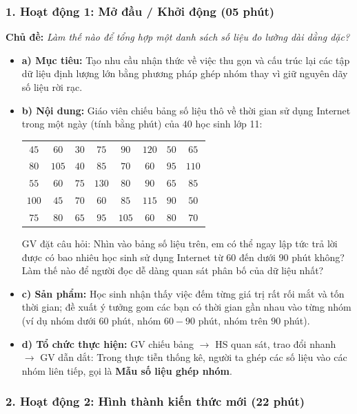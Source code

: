 \documentclass[12pt, a4paper]{article}
\begin{document}
\subsubsection*{1. Hoạt động 1: Mở đầu / Khởi động (05 phút)}
\textbf{Chủ đề:} \textit{Làm thế nào để tổng hợp một danh sách số liệu đo lường dài dằng dặc?}
\begin{itemize}
    \item \textbf{a) Mục tiêu:} Tạo nhu cầu nhận thức về việc thu gọn và cấu trúc lại các tập dữ liệu định lượng lớn bằng phương pháp ghép nhóm thay vì giữ nguyên dãy số liệu rời rạc.
    \item \textbf{b) Nội dung:} Giáo viên chiếu bảng số liệu thô về thời gian sử dụng Internet trong một ngày (tính bằng phút) của $40$ học sinh lớp 11:
    \begin{center}
    \begin{tabular}{|cccccccc|}
    \hline
    $45$ & $60$ & $30$ & $75$ & $90$ & $120$ & $50$ & $65$ \\
    $80$ & $105$ & $40$ & $85$ & $70$ & $60$ & $95$ & $110$ \\
    $55$ & $60$ & $75$ & $130$ & $80$ & $90$ & $65$ & $85$ \\
    $100$ & $45$ & $70$ & $60$ & $85$ & $115$ & $90$ & $50$ \\
    $75$ & $80$ & $65$ & $95$ & $105$ & $60$ & $80$ & $70$ \\
    \hline
    \end{tabular}
    \end{center}
    GV đặt câu hỏi: Nhìn vào bảng số liệu trên, em có thể ngay lập tức trả lời được có bao nhiêu học sinh sử dụng Internet từ $60$ đến dưới $90$ phút không? Làm thế nào để người đọc dễ dàng quan sát phân bố của dữ liệu nhất?
    \item \textbf{c) Sản phẩm:} Học sinh nhận thấy việc đếm từng giá trị rất rối mắt và tốn thời gian; đề xuất ý tưởng gom các bạn có thời gian gần nhau vào từng nhóm (ví dụ nhóm dưới $60$ phút, nhóm $60 - 90$ phút, nhóm trên $90$ phút).
    \item \textbf{d) Tổ chức thực hiện:} GV chiếu bảng $\to$ HS quan sát, trao đổi nhanh $\to$ GV dẫn dắt: Trong thực tiễn thống kê, người ta ghép các số liệu vào các nhóm liên tiếp, gọi là \textbf{Mẫu số liệu ghép nhóm}.
\end{itemize}

\subsubsection*{2. Hoạt động 2: Hình thành kiến thức mới (22 phút)}
\end{document}
